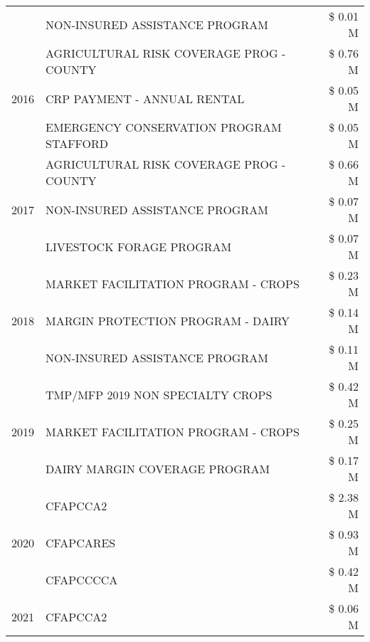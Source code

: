 \begin{tabular}{llr}
 & NON-INSURED ASSISTANCE PROGRAM & \$ 0.01 M \\
\cline{1-3}
\multirow[t]{3}{*}{2016} & AGRICULTURAL RISK COVERAGE PROG - COUNTY & \$ 0.76 M \\
 & CRP PAYMENT - ANNUAL RENTAL & \$ 0.05 M \\
 & EMERGENCY CONSERVATION PROGRAM STAFFORD & \$ 0.05 M \\
\cline{1-3}
\multirow[t]{3}{*}{2017} & AGRICULTURAL RISK COVERAGE PROG - COUNTY & \$ 0.66 M \\
 & NON-INSURED ASSISTANCE PROGRAM & \$ 0.07 M \\
 & LIVESTOCK FORAGE PROGRAM & \$ 0.07 M \\
\cline{1-3}
\multirow[t]{3}{*}{2018} & MARKET FACILITATION PROGRAM - CROPS & \$ 0.23 M \\
 & MARGIN PROTECTION PROGRAM - DAIRY & \$ 0.14 M \\
 & NON-INSURED ASSISTANCE PROGRAM & \$ 0.11 M \\
\cline{1-3}
\multirow[t]{3}{*}{2019} & TMP/MFP 2019 NON SPECIALTY CROPS & \$ 0.42 M \\
 & MARKET FACILITATION PROGRAM - CROPS & \$ 0.25 M \\
 & DAIRY MARGIN COVERAGE PROGRAM & \$ 0.17 M \\
\cline{1-3}
\multirow[t]{3}{*}{2020} & CFAPCCA2 & \$ 2.38 M \\
 & CFAPCARES & \$ 0.93 M \\
 & CFAPCCCCA & \$ 0.42 M \\
\cline{1-3}
2021 & CFAPCCA2 & \$ 0.06 M \\
\cline{1-3}
\bottomrule
\end{tabular}
